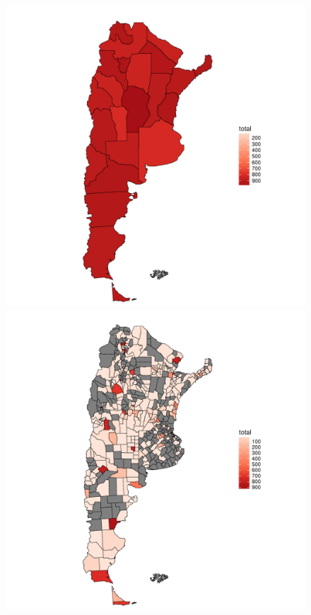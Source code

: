 \begin{figure}[!ht]\centering
  \begin{minipage}{0.31\textwidth}
    \includegraphics[width=\linewidth]{./images/mapaprovincias.pdf}
    \caption{} 
    \label{fig:mapaProvincias} 
   \end{minipage}
   \begin{minipage}{0.31\textwidth}
    \includegraphics[width=\linewidth]{./images/mapadepartamentos.pdf}

\end{minipage}
\end{figure}
